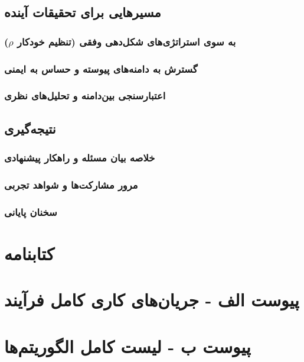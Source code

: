 \documentclass[12pt,a4paper]{report} %
\begin{document}
\section{مسیرهایی برای تحقیقات آینده}
\subsection{به سوی استراتژی‌های شکل‌دهی وفقی (تنظیم خودکار \texorpdfstring{$\rho$}{ρ})}
\subsection{گسترش  به دامنه‌های پیوسته و حساس به ایمنی}
\subsection{اعتبارسنجی بین‌دامنه و تحلیل‌های نظری}

\section{نتیجه‌گیری}
\subsection{خلاصه بیان مسئله و راهکار پیشنهادی}
\subsection{مرور مشارکت‌ها و شواهد تجربی}
\subsection{سخنان پایانی}

\newpage

\chapter*{کتابنامه}
\clearpage

\chapter*{پیوست الف - جریان‌های کاری کامل فرآیند}
\clearpage

\chapter*{پیوست ب - لیست کامل الگوریتم‌ها}
\clearpage
\end{document}
